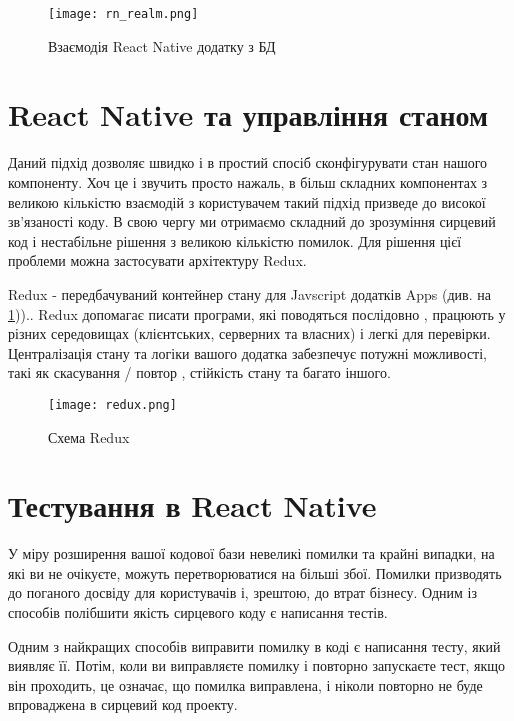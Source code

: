 \begin{figure}
    \label{fig:rn_realm}
    \begin{center}
        \texttt{[image: rn\_realm.png]}
    \end{center}

    Взаємодія React Native додатку з БД
\end{figure}


\section{React Native та управління станом}
\label{sec:rn_state_management}

Даний підхід дозволяє швидко і в простий спосіб сконфігурувати стан нашого компоненту.
Хоч це і звучить просто нажаль, в більш складних компонентах з великою кількістю взаємодій з користувачем такий підхід призведе до високої зв'язаності коду.
В свою чергу ми отримаємо складний до зрозуміння сирцевий код і нестабільне рішення з великою кількістю помилок.
Для рішення цієї проблеми можна застосувати архітектуру Redux.

Redux - передбачуваний контейнер стану для Javscript додатків Apps (див. на \ref{fig:rn_realm}))..
Redux допомагає писати програми, які поводяться послідовно , працюють у різних середовищах (клієнтських, серверних та власних) і легкі для перевірки. \cite{redux_home_page}
Централізація стану та логіки вашого додатка забезпечує потужні можливості, такі як скасування / повтор , стійкість стану та багато іншого. \cite{redux_home_page}

\begin{center}
    \begin{figure}
        \texttt{[image: redux.png]}
        \caption{Схема Redux}
        \label{fig:rn_redux}
    \end{figure}
\end{center}


\section{Тестування в React Native}
\label{sec:rn_testing}
У міру розширення вашої кодової бази невеликі помилки та крайні випадки, на які ви не очікуєте, можуть перетворюватися на більші збої.
Помилки призводять до поганого досвіду для користувачів і, зрештою, до втрат бізнесу.
Одним із способів полібшити якість сирцевого коду є написання тестів.

Одним з найкращих способів виправити помилку в коді є написання тесту, який виявляє її.
Потім, коли ви виправляєте помилку і повторно запускаєте тест, якщо він проходить, це означає, що помилка виправлена, і ніколи повторно не буде впроваджена в сирцевий код проекту.

